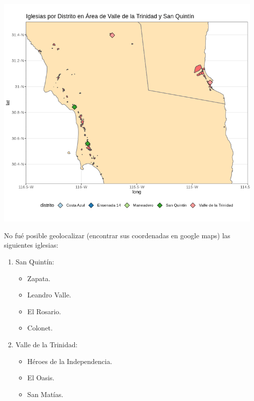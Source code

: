 \documentclass[]{article}
\providecommand{\tightlist}{%
  \setlength{\itemsep}{0pt}\setlength{\parskip}{0pt}}
\begin{document}
\includegraphics[width=5.20833in]{img/iglesiasSQVT.png}

No fué posible geolocalizar (encontrar sus coordenadas en google maps)
las siguientes iglesias:

\begin{enumerate}
\def\labelenumi{\arabic{enumi}.}
\tightlist
\item
  San Quintín:

  \begin{itemize}
  \tightlist
  \item
    Zapata.
  \item
    Leandro Valle.
  \item
    El Rosario.
  \item
    Colonet.
  \end{itemize}
\item
  Valle de la Trinidad:

  \begin{itemize}
  \tightlist
  \item
    Héroes de la Independencia.
  \item
    El Oasis.
  \item
    San Matías.
  \end{itemize}
\end{enumerate}
\end{document}

